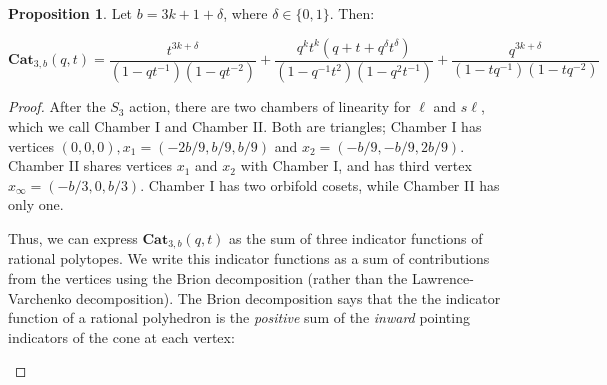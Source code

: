 \documentclass{amsart}[12pt]
\theoremstyle{definition}
\newtheorem{proposition}[dummy]{Proposition}
\newcommand{\Cat}{\mathbf{Cat}}
\newcommand{\sk}{s\ell}
\begin{document}
 



\begin{proposition} \label{prop:qt3}
Let $b=3k+1+\delta$, where $\delta\in\{0,1\}$.  Then:

$$\Cat_{3,b}(q,t)=\frac{t^{3k+\delta}}{(1-qt^{-1})(1-qt^{-2})}+\frac{q^kt^k(q+t+q^\delta t^\delta)}{(1-q^{-1}t^2)(1-q^2t^{-1})}+\frac{q^{3k+\delta}}{(1-tq^{-1})(1-tq^{-2})}$$

\end{proposition}

\begin{proof}
After the $S_3$ action, there are two chambers of linearity for $\ell$ and $\sk$, which we call Chamber I and Chamber II.  Both are triangles; Chamber I has vertices $(0,0,0), x_1=(-2b/9, b/9, b/9)$ and $x_2=(-b/9, -b/9, 2b/9)$.  Chamber II shares vertices $x_1$ and $x_2$ with Chamber I, and has third vertex $x_\infty=(-b/3,0,b/3)$.  Chamber I has two orbifold cosets, while Chamber II has only one.  

Thus, we can express $\Cat_{3,b}(q,t)$ as the sum of three indicator functions of rational polytopes.  We write this indicator functions as a sum of contributions from the vertices using the Brion decomposition (rather than the Lawrence-Varchenko decomposition).  The Brion decomposition says that the the indicator function of a rational polyhedron is the \emph{positive} sum of the \emph{inward} pointing indicators of the cone at each vertex:

\begin{center}
\end{center}
\end{proof}
\end{document}
